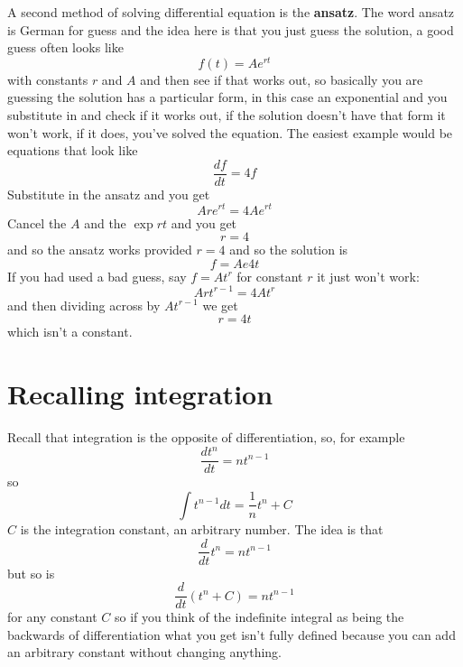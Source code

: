 \documentclass[12pt]{article}
\begin{document}
A second method of solving differential equation is the
\textbf{ansatz}. The word ansatz is German for guess and the idea here is that you just guess the solution, a good guess often looks like
\begin{equation}
  f(t)=Ae^{rt}
\end{equation}
with constants $r$ and $A$ and then see if that works out, so basically you are guessing the solution has a particular form, in this case an exponential and you substitute in and check if it works out, if the solution doesn't have that form it won't work, if it does, you've solved the equation. The easiest example would be equations that look like
\begin{equation}
  \frac{df}{dt}=4f
\end{equation}
Substitute in the ansatz and you get
\begin{equation}
  Are^{rt}=4Ae^{rt}
\end{equation}
Cancel the $A$ and the $\exp{rt}$ and you get
\begin{equation}
  r=4
\end{equation}
and so the ansatz works provided $r=4$ and so the solution is
\begin{equation}
  f=Ae{4t}
\end{equation}
If you had used a bad guess, say $f=At^r$ for constant $r$ it just won't work:
\begin{equation}
  Art^{r-1}=4At^r
\end{equation}
and then dividing across by $At^{r-1}$ we get
\begin{equation}
  r=4t
\end{equation}
which isn't a constant.

\section*{Recalling integration}

Recall that integration is the opposite of differentiation, so, for example
\begin{equation}
  \frac{dt^n}{dt}=nt^{n-1}
\end{equation}
so
\begin{equation}
  \int t^{n-1}dt=\frac{1}{n}t^n+C
\end{equation}
$C$ is the integration constant, an arbitrary number. The idea is that
\begin{equation}
  \frac{d}{dt}t^n=nt^{n-1}
\end{equation}
but so is
\begin{equation}
  \frac{d}{dt}\left(t^n+C\right)=nt^{n-1}
\end{equation}
for any constant $C$ so if you think of the indefinite integral as
being the backwards of differentiation what you get isn't fully defined because you can add an arbitrary constant without changing anything.
\end{document}
